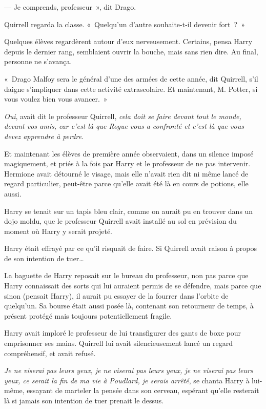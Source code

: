 --- Je comprends, professeur~», dit Drago.

Quirrell regarda la classe.
«~Quelqu'un d'autre souhaite-t-il devenir fort~?~»

Quelques élèves regardèrent autour d'eux nerveusement.
Certains, pensa Harry depuis le dernier rang, semblaient ouvrir la bouche, mais sans rien dire.
Au final, personne ne s'avança.

«~Drago Malfoy sera le général d'une des armées de cette année, dit Quirrell, s'il daigne s'impliquer dans cette activité extrascolaire.
Et maintenant, M. Potter, si vous voulez bien vous avancer.~»

\later

\emph{Oui}, avait dit le professeur Quirrell, \emph{cela doit se faire devant tout le monde, devant vos amis, car c'est là que Rogue vous a confronté et c'est là que vous devez apprendre à perdre}.

Et maintenant les élèves de première année observaient, 
dans un silence imposé magiquement, et priés à la fois par Harry et le professeur de ne pas intervenir.
Hermione avait détourné le visage, mais elle n'avait rien dit ni même lancé de regard particulier, peut-être parce qu'elle avait été là en cours de potions, elle aussi.

Harry se tenait sur un tapis bleu clair, comme on aurait pu en trouver dans un dojo moldu, que le professeur Quirrell avait installé au sol en prévision du moment où Harry y serait projeté.

Harry était effrayé par ce qu'il risquait de faire.
Si Quirrell avait raison à propos de son intention de tuer…

La baguette de Harry reposait sur le bureau du professeur, non pas parce que Harry connaissait des sorts qui lui auraient permis de se défendre, mais parce que sinon (pensait Harry), il aurait pu essayer de la fourrer dans l'orbite de quelqu'un.
Sa bourse était aussi posée là, contenant son retourneur de temps, à présent protégé mais toujours potentiellement fragile.

Harry avait imploré le professeur de lui transfigurer des gants de boxe pour emprisonner ses mains.
Quirrell lui avait silencieusement lancé un regard compréhensif, et avait refusé.

\emph{Je ne viserai pas leurs yeux, je ne viserai pas leurs yeux, je ne viserai pas leurs yeux, ce serait la fin de ma vie à Poudlard, je serais arrêté}, se chanta Harry à lui-même, essayant de marteler la pensée dans son cerveau, espérant qu'elle resterait là si jamais son intention de tuer prenait le dessus.

